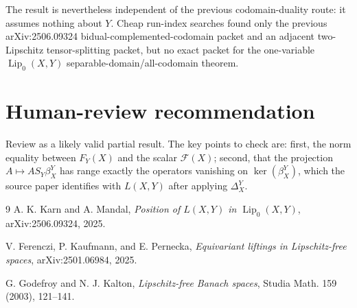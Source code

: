 \documentclass[11pt]{article}
\DeclareMathOperator{\Lip}{Lip}
\begin{document}
The result is nevertheless independent of the previous codomain-duality
route: it assumes nothing about \(Y\). Cheap run-index searches found only
the previous arXiv:2506.09324 bidual-complemented-codomain packet and an
adjacent two-Lipschitz tensor-splitting packet, but no exact packet for the
one-variable \(\Lip_0(X,Y)\) separable-domain/all-codomain theorem.

\section*{Human-review recommendation}

Review as a likely valid partial result. The key points to check are:
first, the norm equality between \(F_Y(X)\) and the scalar
\(\mathcal F(X)\); second, that the projection \(A\mapsto AS_Y\beta_X^Y\)
has range exactly the operators vanishing on \(\ker(\beta_X^Y)\), which the
source paper identifies with \(L(X,Y)\) after applying \(\Delta_X^Y\).

\begin{thebibliography}{9}
A. K. Karn and A. Mandal,
\emph{Position of \(L(X,Y)\) in \(\Lip_0(X,Y)\)},
arXiv:2506.09324, 2025.

V. Ferenczi, P. Kaufmann, and E. Pernecka,
\emph{Equivariant liftings in Lipschitz-free spaces},
arXiv:2501.06984, 2025.

G. Godefroy and N. J. Kalton,
\emph{Lipschitz-free Banach spaces},
Studia Math. 159 (2003), 121--141.
\end{thebibliography}
\end{document}
